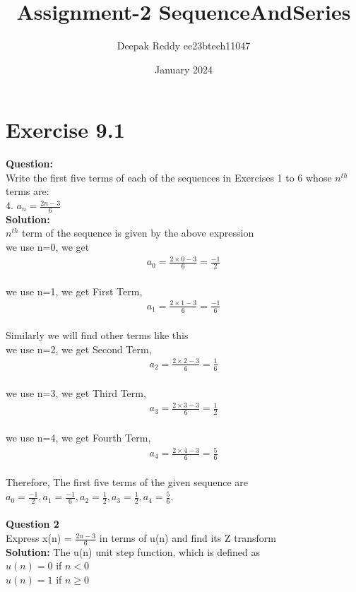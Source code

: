 \documentclass[journal,12pt,twocolumn]{IEEEtran}
\title{Assignment-2 SequenceAndSeries}
\author{Deepak Reddy ee23btech11047}
\date{January 2024}
\theoremstyle{remark}
\begin{document}
\maketitle
\section*{Exercise 9.1}
\textbf{Question:}\\
Write the first five terms of each of the sequences in Exercises 1 to 6 whose $n^{th}$
terms are:\\
4. $a_n = \frac{2n-3}{6}$\\
\textbf{Solution:}\\
$n^{th}$ term of the sequence is given by the above expression\\
we use n=0, we get
\begin{align}a_{0} = \frac{2 \times 0 - 3}{6} = \frac{-1}{2} \end{align}\\
we use n=1, we get First Term,
\begin{align}a_1 = \frac{2 \times 1 - 3}{6} = \frac{-1}{6} \end{align}\\
Similarly we will find other terms like this\\
we use n=2, we get Second Term,
\begin{align} a_{2} = \frac{2 \times 2 - 3}{6} = \frac{1}{6}  \end{align}\\
we use n=3, we get Third Term,
\begin{align} a_{3} = \frac{2 \times 3 - 3}{6} = \frac{1}{2} \end{align}\\
we use n=4, we get Fourth Term,
\begin{align} a_{4} = \frac{2 \times 4 - 3}{6} = \frac{5}{6} \end{align}\\
Therefore, The first five terms of the given sequence are
$a_0 = \frac{-1}{2}, a_1 = \frac{-1}{6},a_2 = \frac{1}{2}, a_3= \frac{1}{2} , a_4 = \frac{5}{6} .$\\
\\
\textbf{Question 2}\\
Express x(n) = $\frac{2n-3}{6}$ in terms of u(n) and find its Z transform\\
\textbf{Solution:}
The u(n) unit step function, which is defined as\\
$u(n) = 0$ if $ n < 0 $\\
$u(n)=1 $ if $n \ge 0 $\\
\end{document}

